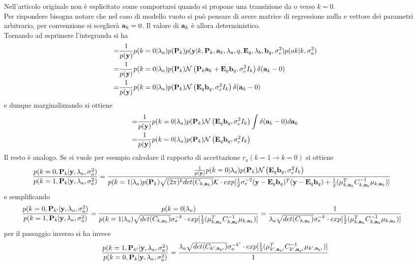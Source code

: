 Nell'articolo originale non è esplicitato come comportarsi quando si propone una transizione da o verso $k=0$.\\
Per rispondere bisogna notare che nel caso di modello vuoto si può pensare di avere matrice di regressione nulla e vettore dei parametri arbitrario, per convenzione si sceglierà $\textbf{a}_k=0$. Il valore di $\textbf{a}_k$ è allora deterministico.\\
Tornando ad esprimere l'integranda si ha
\begin{align*}
=&\frac{1}{p(\textbf{y})}p(k=0|\lambda_a)p(\textbf{P}_k)p(\textbf{y}|k,\textbf{P}_k,\textbf{a}_k,\lambda_a,q,\textbf{E}_q,\lambda_b,\textbf{b}_q,\sigma_e^2)p(ak|k,\sigma_a^2)\\
=&\frac{1}{p(\textbf{y})}p(k=0|\lambda_a)p(\textbf{P}_k)\mathcal{N}\left(\textbf{P}_k\textbf{a}_k+\textbf{E}_q\textbf{b}_q,\sigma_e^2 I_k\right)\delta(\textbf{a}_k-0)\\
=&\frac{1}{p(\textbf{y})}p(k=0|\lambda_a)p(\textbf{P}_k)\mathcal{N}\left(\textbf{E}_q\textbf{b}_q,\sigma_e^2 I_k\right)\delta(\textbf{a}_k-0)\\
\end{align*}
e dunque marginalizzando si ottiene
\begin{align*}
=&\frac{1}{p(\textbf{y})}p(k=0|\lambda_a)p(\textbf{P}_k)\mathcal{N}\left(\textbf{E}_q\textbf{b}_q,\sigma_e^2 I_k\right)\int\delta(\textbf{a}_k-0)d\textbf{a}_k\\
=&\frac{1}{p(\textbf{y})}p(k=0|\lambda_a)p(\textbf{P}_k)\mathcal{N}\left(\textbf{E}_q\textbf{b}_q,\sigma_e^2 I_k\right)\\
\end{align*}
Il resto è analogo. Se si vuole per esempio calcolare il rapporto di accettazione $r_a(k=1\rightarrow k=0)$ si ottiene
\begin{align*}
\frac{p(k=0,\textbf{P}_k | \textbf{y},\lambda_a,\sigma_a^2)}{p(k=1,\textbf{P}_k | \textbf{y},\lambda_a,\sigma_a^2)}&=\frac{\frac{1}{p(\textbf{y})}p(k=0|\lambda_a)p(\textbf{P}_k)\mathcal{N}\left(\textbf{E}_q\textbf{b}_q,\sigma_e^2 I_k\right)}{p(k=1|\lambda_a)p(\textbf{P}_k)\sqrt{(2\pi)^k det(C_{k,\textbf{a}_k})}\mathcal{K}\cdot exp[\frac{1}{2} \sigma_e^{-2}(\textbf{y}-\textbf{E}_q\textbf{b}_q)^{T}(\textbf{y}-\textbf{E}_q\textbf{b}_q)+\frac{1}{2}(\mu_{k,\textbf{a}_k}^T C_{k,\textbf{a}_k}^{-1}\mu_{k,\textbf{a}_k})]}
\end{align*}
e semplificando
\begin{align*}
\frac{p(k=0,\textbf{P}_{k'} | \textbf{y},\lambda_a,\sigma_a^2)}{p(k=1,\textbf{P}_k | \textbf{y},\lambda_a,\sigma_a^2)}&=\frac{p(k=0|\lambda_a)}{p(k=1|\lambda_a)\sqrt{det(C_{k,\textbf{a}_k})}\sigma_a^{-k}\cdot exp[\frac{1}{2}(\mu_{k,\textbf{a}_k}^T C_{k,\textbf{a}_k}^{-1}\mu_{k,\textbf{a}_k})]}=\frac{1}{\lambda_a\sqrt{det(C_{k,\textbf{a}_k})}\sigma_a^{-k}\cdot exp[\frac{1}{2}(\mu_{k,\textbf{a}_k}^T C_{k,\textbf{a}_k}^{-1}\mu_{k,\textbf{a}_k})]}
\end{align*}
per il passaggio inverso si ha invece
\begin{align*}
\frac{p(k=1,\textbf{P}_{k'} | \textbf{y},\lambda_a,\sigma_a^2)}{p(k=0,\textbf{P}_k | \textbf{y},\lambda_a,\sigma_a^2)}=\frac{\lambda_a\sqrt{det(C_{k',\textbf{a}_{k'}})}\sigma_a^{-k'}\cdot exp[\frac{1}{2}(\mu_{k',\textbf{a}_{k'}}^T C_{k',\textbf{a}_{k'}}^{-1}\mu_{k',\textbf{a}_{k'}})]}{1}
\end{align*}